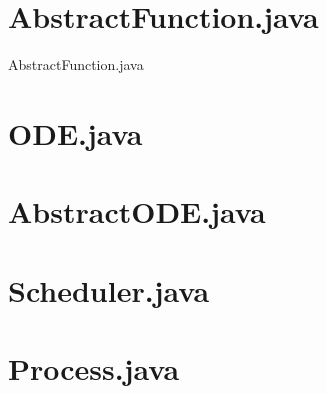\section{AbstractFunction.java}
\label{abstractfunction}

{AbstractFunction.java}

\section{ODE.java}

\label{ode}

\section{AbstractODE.java}

\label{abstractode}

\section{Scheduler.java}

\label{scheduler}

\section{Process.java}

\label{process}


